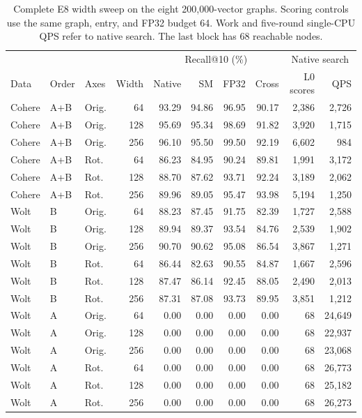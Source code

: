 \begin{table}[!htbp]
\centering
\small
\setlength{\tabcolsep}{3pt}
\begin{tabular}{lllrrrrrrr}
\toprule
& & & & \multicolumn{4}{c}{Recall@10 (\%)} & \multicolumn{2}{c}{Native search} \\
Data & Order & Axes & Width & Native & SM & FP32 & Cross & L0 scores & QPS \\
\midrule
Cohere & A+B & Orig. & 64 & 93.29 & 94.86 & 96.95 & 90.17 & 2,386 & 2,726 \\
Cohere & A+B & Orig. & 128 & 95.69 & 95.34 & 98.69 & 91.82 & 3,920 & 1,715 \\
Cohere & A+B & Orig. & 256 & 96.10 & 95.50 & 99.50 & 92.19 & 6,602 & 984 \\
Cohere & A+B & Rot. & 64 & 86.23 & 84.95 & 90.24 & 89.81 & 1,991 & 3,172 \\
Cohere & A+B & Rot. & 128 & 88.70 & 87.62 & 93.71 & 92.24 & 3,189 & 2,062 \\
Cohere & A+B & Rot. & 256 & 89.96 & 89.05 & 95.47 & 93.98 & 5,194 & 1,250 \\
\midrule
Wolt & B & Orig. & 64 & 88.23 & 87.45 & 91.75 & 82.39 & 1,727 & 2,588 \\
Wolt & B & Orig. & 128 & 89.94 & 89.37 & 93.54 & 84.76 & 2,539 & 1,902 \\
Wolt & B & Orig. & 256 & 90.70 & 90.62 & 95.08 & 86.54 & 3,867 & 1,271 \\
Wolt & B & Rot. & 64 & 86.44 & 82.63 & 90.55 & 84.87 & 1,667 & 2,596 \\
Wolt & B & Rot. & 128 & 87.47 & 86.14 & 92.45 & 88.05 & 2,490 & 2,013 \\
Wolt & B & Rot. & 256 & 87.31 & 87.08 & 93.73 & 89.95 & 3,851 & 1,212 \\
\midrule
Wolt & A & Orig. & 64 & 0.00 & 0.00 & 0.00 & 0.00 & 68 & 24,649 \\
Wolt & A & Orig. & 128 & 0.00 & 0.00 & 0.00 & 0.00 & 68 & 22,937 \\
Wolt & A & Orig. & 256 & 0.00 & 0.00 & 0.00 & 0.00 & 68 & 23,068 \\
Wolt & A & Rot. & 64 & 0.00 & 0.00 & 0.00 & 0.00 & 68 & 26,773 \\
Wolt & A & Rot. & 128 & 0.00 & 0.00 & 0.00 & 0.00 & 68 & 25,182 \\
Wolt & A & Rot. & 256 & 0.00 & 0.00 & 0.00 & 0.00 & 68 & 26,273 \\
\bottomrule
\end{tabular}
\caption{Complete E8 width sweep on the eight 200{,}000-vector graphs. Scoring controls use the same graph, entry, and FP32 budget 64. Work and five-round single-CPU QPS refer to native search. The last block has 68 reachable nodes.}
\label{tab:actual-graph}
\end{table}

